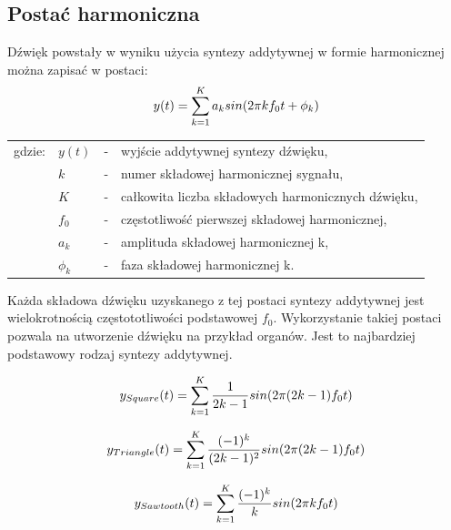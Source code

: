 \subsection{Postać harmoniczna} \label{pos_harm}
Dźwięk powstały w wyniku użycia syntezy addytywnej w formie harmonicznej można zapisać w postaci:
\begin{equation} \label{equ:addit_time_harm}
y(t) = \sum_{k=1}^{K} a_{k}sin(2\pi kf_{0}t + \phi_{k})  \\  
\end{equation}
\begin{tabular}{ l l l l}
	gdzie: & $y(t)$ &  - & wyjście addytywnej syntezy dźwięku, \\
	&	$k$ & - &  numer składowej harmonicznej sygnału, \\
	&	$K$ & - &  całkowita liczba składowych harmonicznych dźwięku,\\
	&	$f_{0}$ & - &  częstotliwość pierwszej składowej harmonicznej,\\
	&	$a_{k}$ & - &  amplituda składowej harmonicznej k, \\
	&	$\phi_{k}$ & - &  faza składowej harmonicznej k. \\
\end{tabular}

Każda składowa dźwięku uzyskanego z tej postaci syntezy addytywnej jest wielokrotnością częstototliwości podstawowej $f_{0}$. Wykorzystanie takiej postaci pozwala na utworzenie dźwięku na przykład organów. Jest to najbardziej podstawowy rodzaj syntezy addytywnej.


\begin{equation} \label{equ:addit_sqr}
y_{Square}(t) = \sum_{k=1}^{K} \frac{1}{2k-1} sin(2\pi (2k-1)f_{0}t) \\
\end{equation}

\begin{equation} \label{equ:addit_trng}
y_{Triangle}(t) = \sum_{k=1}^{K} \frac{(-1)^k}{(2k-1)^2} sin(2\pi (2k-1)f_{0}t)  \\
\end{equation}

\begin{equation} \label{equ:addit_sawth}
y_{Sawtooth}(t) = \sum_{k=1}^{K} \frac{(-1)^k}{k} sin(2\pi kf_{0}t) \\
\end{equation}

